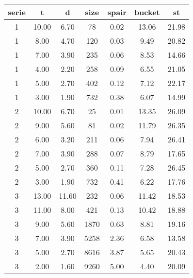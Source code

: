 \begin{tabular}{|c|c|c|c|c|c|c|}
\hline
\textbf{serie} & \textbf{t} & \textbf{d} & \textbf{size} & \textbf{spair} & \textbf{bucket} & \textbf{st}\\
\hline
1 & 10.00 & 6.70 & 78 & 0.02 & 13.06 & 21.98\\
\hline
1 & 8.00 & 4.70 & 120 & 0.03 & 9.49 & 20.82\\
\hline
1 & 7.00 & 3.90 & 235 & 0.06 & 8.53 & 14.66\\
\hline
1 & 4.00 & 2.20 & 258 & 0.09 & 6.55 & 21.05\\
\hline
1 & 5.00 & 2.70 & 402 & 0.12 & 7.12 & 22.17\\
\hline
1 & 3.00 & 1.90 & 732 & 0.38 & 6.07 & 14.99\\
\hline
2 & 10.00 & 6.70 & 25 & 0.01 & 13.35 & 26.09\\
\hline
2 & 9.00 & 5.60 & 81 & 0.02 & 11.79 & 26.35\\
\hline
2 & 6.00 & 3.20 & 211 & 0.06 & 7.94 & 26.41\\
\hline
2 & 7.00 & 3.90 & 288 & 0.07 & 8.79 & 17.65\\
\hline
2 & 5.00 & 2.70 & 360 & 0.11 & 7.28 & 26.45\\
\hline
2 & 3.00 & 1.90 & 732 & 0.41 & 6.22 & 17.76\\
\hline
3 & 13.00 & 11.60 & 232 & 0.06 & 11.42 & 18.53\\
\hline
3 & 11.00 & 8.00 & 421 & 0.13 & 10.42 & 18.88\\
\hline
3 & 9.00 & 5.60 & 1870 & 0.63 & 8.81 & 19.16\\
\hline
3 & 7.00 & 3.90 & 5258 & 2.36 & 6.58 & 13.58\\
\hline
3 & 5.00 & 2.70 & 8616 & 3.87 & 5.65 & 20.43\\
\hline
3 & 2.00 & 1.60 & 9260 & 5.00 & 4.40 & 20.09\\
\hline
\end{tabular}
